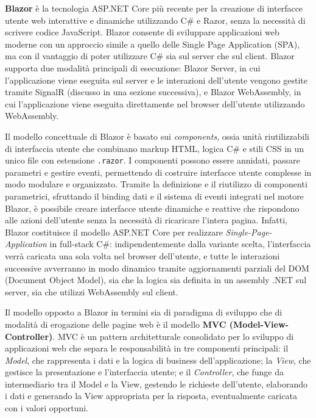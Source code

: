 \textbf{Blazor} è la tecnologia ASP.NET Core più recente per la creazione di interfacce utente web interattive e dinamiche utilizzando C\# e Razor, senza la necessità di scrivere codice JavaScript. Blazor consente di sviluppare applicazioni web moderne con un approccio simile a quello delle Single Page Application (SPA), ma con il vantaggio di poter utilizzare C\# sia sul server che sul client.
Blazor supporta due modalità principali di esecuzione: Blazor Server, in cui l'applicazione viene eseguita sul server e le interazioni dell'utente vengono gestite tramite SignalR (discusso in una sezione successiva), e Blazor WebAssembly, in cui l'applicazione viene eseguita direttamente nel browser dell'utente utilizzando WebAssembly.

Il modello concettuale di Blazor è basato sui \emph{components}, ossia unità riutilizzabili di interfaccia utente che combinano markup HTML, logica C\# e stili CSS in un unico file con estensione \texttt{.razor}. I componenti possono essere annidati, passare parametri e gestire eventi, permettendo di costruire interfacce utente complesse in modo modulare e organizzato. Tramite la definizione e il riutilizzo di componenti parametrici, sfruttando il binding dati e il sistema di eventi integrati nel motore Blazor, è possibile creare interfacce utente dinamiche e reattive che rispondono alle azioni dell'utente senza la necessità di ricaricare l'intera pagina.
Infatti, Blazor costituisce il modello ASP.NET Core per realizzare \emph{Single-Page-Application} in full-stack C\#: indipendentemente dalla variante scelta, l'interfaccia verrà caricata una sola volta nel browser dell'utente, e tutte le interazioni successive avverranno in modo dinamico tramite aggiornamenti parziali del DOM (Document Object Model), sia che la logica sia definita in un assembly .NET sul server, sia che utilizzi WebAssembly sul client.

Il modello opposto a Blazor in termini sia di paradigma di sviluppo che di modalità di erogazione delle pagine web è il modello \textbf{MVC (Model-View-Controller)}.
MVC è un pattern architetturale consolidato per lo sviluppo di applicazioni web che separa le responsabilità in tre componenti principali: il \emph{Model}, che rappresenta i dati e la logica di business dell'applicazione; la \emph{View}, che gestisce la presentazione e l'interfaccia utente; e il \emph{Controller}, che funge da intermediario tra il Model e la View, gestendo le richieste dell'utente, elaborando i dati e generando la View appropriata per la risposta, eventualmente caricata con i valori opportuni.


